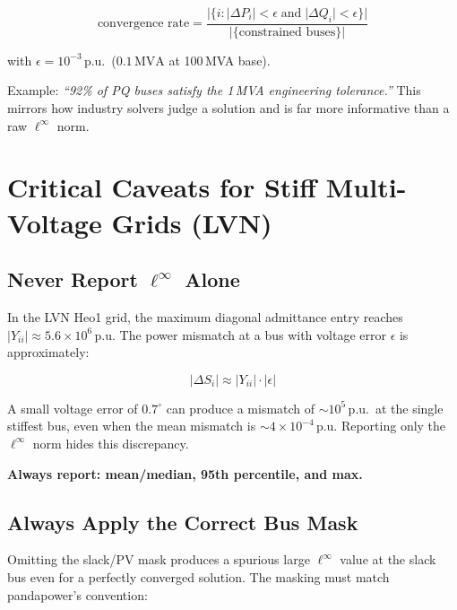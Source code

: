 \documentclass{article}
\begin{document}
\begin{equation}
  \text{convergence rate}
  = \frac{|\{i : |\Delta P_i| < \epsilon \;\text{and}\; |\Delta Q_i| < \epsilon\}|}
         {|\{\text{constrained buses}\}|}
  \label{eq:convrate}
\end{equation}

with $\epsilon = 10^{-3}$\,p.u.\ ($0.1\,\mathrm{MVA}$ at 100\,MVA base).

\medskip
\noindent Example: \emph{``92\% of PQ buses satisfy the 1\,MVA engineering
tolerance.''} This mirrors how industry solvers judge a solution and is
far more informative than a raw $\ell^\infty$ norm.

\section{Critical Caveats for Stiff Multi-Voltage Grids (LVN)}

\subsection{Never Report $\ell^\infty$ Alone}

In the LVN Heo1 grid, the maximum diagonal admittance entry reaches
$|Y_{ii}| \approx 5.6 \times 10^6$\,p.u.  The power mismatch at a bus
with voltage error $\epsilon$ is approximately:

\begin{equation}
  |\Delta S_i| \approx |Y_{ii}| \cdot |\epsilon|
\end{equation}

A small voltage error of $0.7^\circ$ can produce a mismatch of
$\sim 10^5$\,p.u.\ at the single stiffest bus, even when the
mean mismatch is $\sim 4 \times 10^{-4}$\,p.u.  Reporting only the
$\ell^\infty$ norm hides this discrepancy.

\textbf{Always report: mean/median, 95th percentile, and max.}

\subsection{Always Apply the Correct Bus Mask}

Omitting the slack/PV mask produces a spurious large $\ell^\infty$
value at the slack bus even for a perfectly converged solution.  The
masking must match pandapower's convention:
\end{document}
